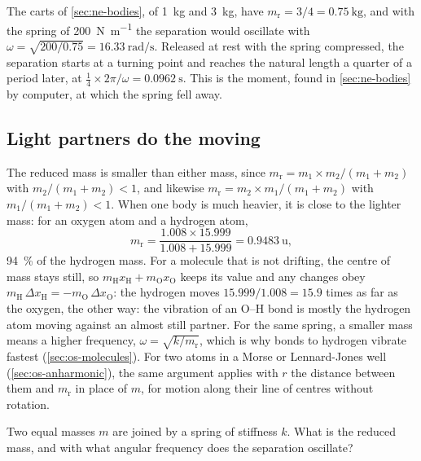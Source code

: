 The carts of \cref{sec:ne-bodies}, of \SI{1}{\kilogram} and
\SI{3}{\kilogram}, have $m_{\mathrm r} = 3/4 = \SI{0.75}{\kilogram}$, and with the
spring of \SI{200}{\newton\per\metre} the separation would oscillate with
$\omega = \sqrt{200/0.75} = \SI{16.33}{\radian\per\second}$. Released at
rest with the spring compressed, the separation starts at a turning point
and reaches the natural length a quarter of a period later, at
$\frac14\times2\pi/\omega = \SI{0.0962}{\second}$. This is the moment,
found in \cref{sec:ne-bodies} by computer, at which the spring fell away.

\subsection*{Light partners do the moving}

The reduced mass is smaller than either mass, since $m_{\mathrm r} =
m_1\times m_2/(m_1 + m_2)$ with $m_2/(m_1 + m_2) < 1$, and likewise
$m_{\mathrm r} = m_2\times m_1/(m_1 + m_2)$ with $m_1/(m_1 + m_2) < 1$. When one body is much heavier, it is close to
the lighter mass: for an oxygen atom and a hydrogen atom,
\begin{equation*}
   m_{\mathrm r} = \frac{1.008\times15.999}{1.008 + 15.999} = \SI{0.9483}{\amu} ,
\end{equation*}
\SI{94}{\percent} of the hydrogen mass. For a molecule that is not drifting,
the centre of mass stays still, so $m_{\mathrm H}x_{\mathrm H} + m_{\mathrm
O}x_{\mathrm O}$ keeps its value and any changes obey $m_{\mathrm
H}\,\Delta x_{\mathrm H} = -m_{\mathrm O}\,\Delta x_{\mathrm O}$: the
hydrogen moves $15.999/1.008 = 15.9$ times as far as the oxygen, the other
way: the vibration
of an O--H bond is mostly the hydrogen atom moving against an almost still
partner. For the same spring, a smaller mass means a higher frequency,
$\omega = \sqrt{k/m_{\mathrm r}}$, which is why bonds to hydrogen vibrate fastest
(\cref{sec:os-molecules}). For two atoms in a Morse or Lennard-Jones well
(\cref{sec:os-anharmonic}), the same argument applies with $r$ the
distance between them and $m_{\mathrm r}$ in place of $m$, for motion
along their line of centres without rotation.

\begin{selfcheck}
Two equal masses $m$ are joined by a spring of stiffness $k$. What is the
reduced mass, and with what angular frequency does the separation
oscillate?
\end{selfcheck}

